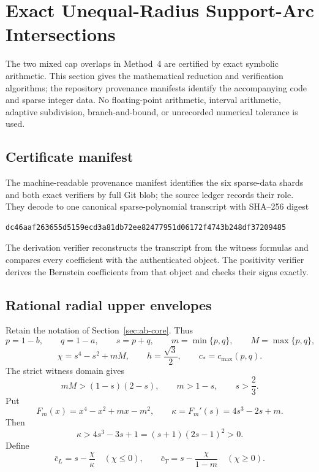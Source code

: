 \section{Exact Unequal-Radius Support-Arc Intersections}
\label{sec:strategy4-exact-certificate}

The two mixed cap overlaps in Method~4 are certified by exact symbolic
arithmetic.  This section gives the mathematical reduction and verification
algorithms; the repository provenance manifests identify the accompanying
code and sparse integer data.  No floating-point arithmetic, interval
arithmetic, adaptive subdivision, branch-and-bound, or unrecorded numerical
tolerance is used.

\subsection{Certificate manifest}

The machine-readable provenance manifest identifies the six sparse-data
shards and both exact verifiers by full Git blob; the source ledger records
their role.  They decode to one canonical sparse-polynomial transcript with
SHA--256 digest
\begin{verbatim}
dc46aaf263655d5159ecd3a81db72ee82477951d06172f4743b248df37209485
\end{verbatim}
The derivation verifier reconstructs the transcript from the witness formulas
and compares every coefficient with the authenticated object. The positivity
verifier derives the Bernstein coefficients from that object and checks their
signs exactly.

\subsection{Rational radial upper envelopes}

Retain the notation of Section~\ref{sec:ab-core}.  Thus
\[
 p=1-b,\qquad q=1-a,\qquad s=p+q,\qquad
 m=\min\{p,q\},\qquad M=\max\{p,q\},
\]
\[
 \chi=s^4-s^2+mM,\qquad h=\frac{\sqrt3}{2},\qquad
 c_*=c_{\max}(p,q).
\]
The strict witness domain gives
\begin{equation}
 mM>(1-s)(2-s),\qquad m>1-s,\qquad s>\frac23.
 \label{eq:certificate-domain}
\end{equation}
Put
\[
 F_m(x)=x^4-x^2+mx-m^2,\qquad
 \kappa=F_m'(s)=4s^3-2s+m.
\]
Then
\[
 \kappa>4s^3-3s+1=(s+1)(2s-1)^2>0.
\]
Define
\begin{equation}
 \bar c_L=s-\frac{\chi}{\kappa}\quad(\chi\le0),
 \qquad
 \bar c_T=s-\frac{\chi}{1-m}\quad(\chi\ge0).
 \label{eq:certificate-cbar}
\end{equation}


